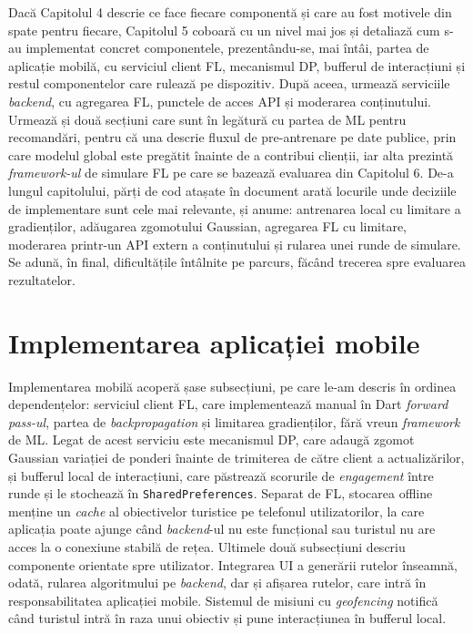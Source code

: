 \documentclass[12pt,a4paper]{report}
\begin{document}
Dacă Capitolul 4 descrie ce face fiecare componentă și care au fost motivele din spate pentru fiecare, Capitolul 5 coboară cu un nivel mai jos și detaliază cum s-au implementat concret componentele, prezentându-se, mai întâi, partea de aplicație mobilă, cu serviciul client FL, mecanismul DP, bufferul de interacțiuni și restul componentelor care rulează pe dispozitiv. După aceea, urmează serviciile \textit{backend}, cu agregarea FL, punctele de acces API și moderarea conținutului. Urmează și două secțiuni care sunt în legătură cu partea de ML pentru recomandări, pentru că una descrie fluxul de pre-antrenare pe date publice, prin care modelul global este pregătit înainte de a contribui clienții, iar alta prezintă \textit{framework-ul} de simulare FL pe care se bazează evaluarea din Capitolul 6. De-a lungul capitolului, părți de cod atașate în document arată locurile unde deciziile de implementare sunt cele mai relevante, și anume: antrenarea local cu limitare a gradienților, adăugarea zgomotului Gaussian, agregarea FL cu limitare, moderarea printr-un API extern a conținutului și rularea unei runde de simulare. Se adună, în final, dificultățile întâlnite pe parcurs, făcând trecerea spre evaluarea rezultatelor.

\section{Implementarea aplicației mobile}

Implementarea mobilă acoperă șase subsecțiuni, pe care le-am descris în ordinea dependențelor: serviciul client FL, care implementează manual în Dart \textit{forward pass-ul}, partea de \textit{backpropagation} și limitarea gradienților, fără vreun \textit{framework} de ML. Legat de acest serviciu este mecanismul DP, care adaugă zgomot Gaussian variației de ponderi înainte de trimiterea de către client a actualizărilor, și bufferul local de interacțiuni, care păstrează scorurile de \textit{engagement} între runde și le stochează în \texttt{SharedPreferences}. Separat de FL, stocarea offline menține un \textit{cache} al obiectivelor turistice pe telefonul utilizatorilor, la care aplicația poate ajunge când \textit{backend}-ul nu este funcțional sau turistul nu are acces la o conexiune stabilă de rețea. Ultimele două subsecțiuni descriu componente orientate spre utilizator. Integrarea UI a generării rutelor înseamnă, odată, rularea algoritmului pe \textit{backend}, dar și afișarea rutelor, care intră în responsabilitatea aplicației mobile. Sistemul de misiuni cu \textit{geofencing} notifică când turistul intră în raza unui obiectiv și pune interacțiunea în bufferul local.
\end{document}
